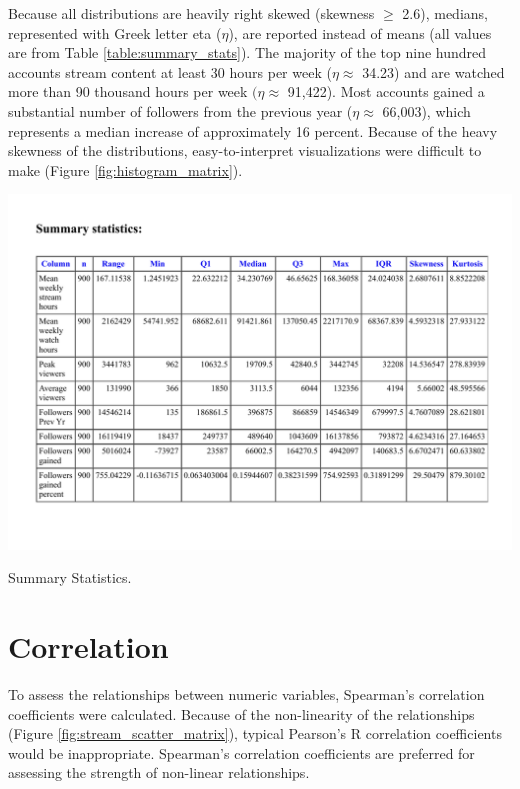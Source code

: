 \documentclass[12pt]{article}
\begin{document}
Because all distributions are heavily right skewed (skewness $\geq$ 2.6), medians, represented with Greek letter eta ($\eta$), are reported instead of means (all values are from Table \ref{table:summary_stats}). The majority of the top nine hundred accounts stream content at least 30 hours per week ($\eta \approx$ 34.23) and are watched more than 90 thousand hours per week $(\eta \approx$ 91,422). Most accounts gained a substantial number of followers from the previous year ($\eta \approx$ 66,003), which represents a median increase of approximately 16 percent. Because of the heavy skewness of the distributions, easy-to-interpret visualizations were difficult to make (Figure \ref{fig:histogram_matrix}).

\begin{table}[ht]
  \centering
  \includegraphics[width=\linewidth]{../StatCrunch_Results/table}
  \captionsetup{justification=centering, singlelinecheck=false, margin=2cm}
  \caption[Summary Statistics]{Summary Statistics.}
  \label{table:summary_stats}
\end{table}

\section{Correlation}

To assess the relationships between numeric variables, Spearman’s correlation coefficients were calculated. Because of the non-linearity of the relationships (Figure \ref{fig:stream_scatter_matrix}), typical Pearson’s R correlation coefficients would be inappropriate. Spearman’s correlation coefficients are preferred for assessing the strength of non-linear relationships.
\end{document}
